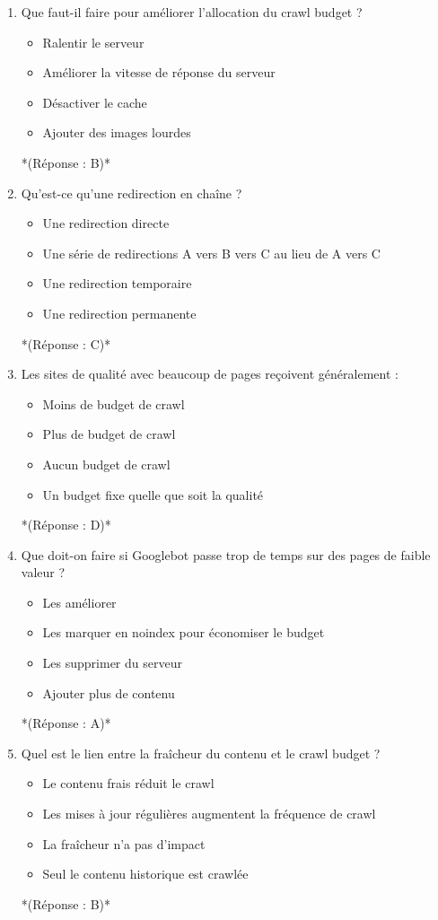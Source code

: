 \documentclass[12pt,a4paper,twoside]{report}
\begin{document}
\begin{enumerate}
\item Que faut-il faire pour améliorer l'allocation du crawl budget ?
\begin{itemize}
\item[A)] Ralentir le serveur
\item[B)] Améliorer la vitesse de réponse du serveur
\item[C)] Désactiver le cache
\item[D)] Ajouter des images lourdes
\end{itemize}
*(Réponse : B)*

\item Qu'est-ce qu'une redirection en chaîne ?
\begin{itemize}
\item[A)] Une redirection directe
\item[B)] Une série de redirections A vers B vers C au lieu de A vers C
\item[C)] Une redirection temporaire
\item[D)] Une redirection permanente
\end{itemize}
*(Réponse : C)*

\item Les sites de qualité avec beaucoup de pages reçoivent généralement :
\begin{itemize}
\item[A)] Moins de budget de crawl
\item[B)] Plus de budget de crawl
\item[C)] Aucun budget de crawl
\item[D)] Un budget fixe quelle que soit la qualité
\end{itemize}
*(Réponse : D)*

\item Que doit-on faire si Googlebot passe trop de temps sur des pages de faible valeur ?
\begin{itemize}
\item[A)] Les améliorer
\item[B)] Les marquer en noindex pour économiser le budget
\item[C)] Les supprimer du serveur
\item[D)] Ajouter plus de contenu
\end{itemize}
*(Réponse : A)*

\item Quel est le lien entre la fraîcheur du contenu et le crawl budget ?
\begin{itemize}
\item[A)] Le contenu frais réduit le crawl
\item[B)] Les mises à jour régulières augmentent la fréquence de crawl
\item[C)] La fraîcheur n'a pas d'impact
\item[D)] Seul le contenu historique est crawlée
\end{itemize}
*(Réponse : B)*


\end{enumerate}
\end{document}
